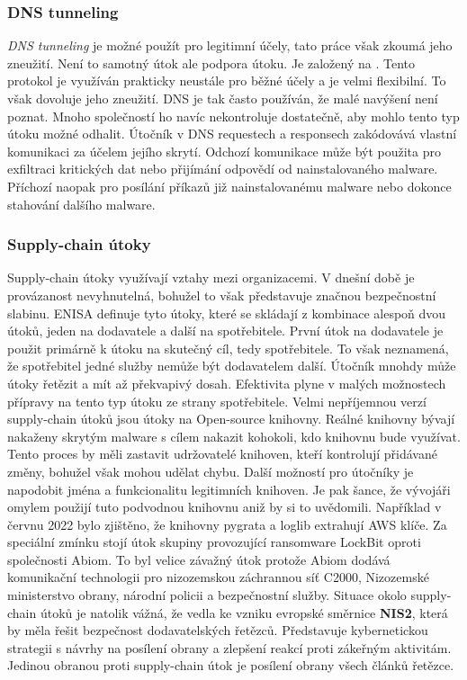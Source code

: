 \subsubsection{DNS tunneling}
\textit{DNS tunneling} je možné použít pro legitimní účely, tato práce však zkoumá jeho zneužití.
Není to samotný útok ale podpora útoku.
Je založený na .
Tento protokol je využíván prakticky neustále pro běžné účely a je velmi flexibilní.
To však dovoluje jeho zneužití.
\ac{DNS} je tak často používán, že malé navýšení není poznat.
Mnoho společností ho navíc nekontroluje dostatečně, aby mohlo tento typ útoku možné odhalit.
Útočník v \ac{DNS} requestech a responsech zakódovává vlastní komunikaci za účelem jejího skrytí.
Odchozí komunikace může být použita pro exfiltraci kritických dat nebo přijímání odpovědí od nainstalovaného malware.
Příchozí naopak pro posílání příkazů již nainstalovanému malware nebo dokonce stahování dalšího malware.\cite{cisco_most_common_attack, bright_sec_dns_tunneling}

\subsubsection{Supply-chain útoky}
Supply-chain útoky využívají vztahy mezi organizacemi.
V dnešní době je provázanost nevyhnutelná, bohužel to však představuje značnou bezpečnostní slabinu.
\ac{ENISA} definuje tyto útoky, které se skládají z kombinace alespoň dvou útoků, jeden na dodavatele a další na spotřebitele.
První útok na dodavatele je použit primárně k útoku na skutečný cíl, tedy spotřebitele.
To však neznamená, že spotřebitel jedné služby nemůže být dodavatelem další.
Útočník mnohdy může útoky řetězit a mít až překvapivý dosah.
Efektivita plyne v malých možnostech přípravy na tento typ útoku ze strany spotřebitele.
Velmi nepříjemnou verzí supply-chain útoků jsou útoky na Open-source knihovny.
Reálné knihovny bývají nakaženy skrytým malware s cílem nakazit kohokoli, kdo knihovnu bude využívat.
Tento proces by měli zastavit udržovatelé knihoven, kteří kontrolují přidávané změny, bohužel však mohou udělat chybu.
Další možností pro útočníky je napodobit jména a funkcionalitu legitimních knihoven.
Je pak šance, že vývojáři omylem použijí tuto podvodnou knihovnu aniž by si to uvědomili.
Například v červnu 2022 bylo zjištěno, že knihovny pygrata a loglib extrahují AWS klíče.
Za speciální zmínku stojí útok skupiny provozující ransomware LockBit oproti společnosti Abiom.
To byl velice závažný útok protože Abiom dodává komunikační technologii pro nizozemskou záchrannou síť C2000,
Nizozemské ministerstvo obrany, národní policii a bezpečnostní služby.
Situace okolo supply-chain útoků je natolik vážná, že vedla ke vzniku evropské směrnice \textbf{NIS2}, která by měla řešit bezpečnost dodavatelských řetězců.
Představuje kybernetickou strategii s návrhy na posílení obrany a zlepšení reakcí proti zákeřným aktivitám.
Jedinou obranou proti supply-chain útok je posílení obrany všech článků řetězce.\cite{Enisa_thread_landscape}


